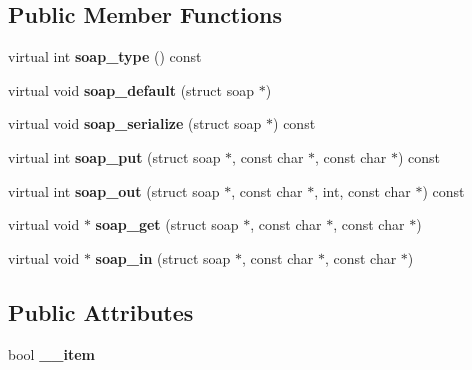 \subsection*{Public Member Functions}
\begin{DoxyCompactItemize}
\item 
\hypertarget{classxsd____boolean_abaa5493fa0ed974d9957b5375282f903}{
virtual int {\bfseries soap\_\-type} () const }
\label{classxsd____boolean_abaa5493fa0ed974d9957b5375282f903}

\item 
\hypertarget{classxsd____boolean_a8f8b468a05c6dbb8f914ab4df0ede130}{
virtual void {\bfseries soap\_\-default} (struct soap $\ast$)}
\label{classxsd____boolean_a8f8b468a05c6dbb8f914ab4df0ede130}

\item 
\hypertarget{classxsd____boolean_a19278a6bc6beb928493f9ec479bf70f7}{
virtual void {\bfseries soap\_\-serialize} (struct soap $\ast$) const }
\label{classxsd____boolean_a19278a6bc6beb928493f9ec479bf70f7}

\item 
\hypertarget{classxsd____boolean_ad3107dbcd150cace93be8add4eb9410d}{
virtual int {\bfseries soap\_\-put} (struct soap $\ast$, const char $\ast$, const char $\ast$) const }
\label{classxsd____boolean_ad3107dbcd150cace93be8add4eb9410d}

\item 
\hypertarget{classxsd____boolean_a6e22f1d1ef885c789d45e92e9e72dc3d}{
virtual int {\bfseries soap\_\-out} (struct soap $\ast$, const char $\ast$, int, const char $\ast$) const }
\label{classxsd____boolean_a6e22f1d1ef885c789d45e92e9e72dc3d}

\item 
\hypertarget{classxsd____boolean_a97d12c069bef37577a4983f2a8cb9ee8}{
virtual void $\ast$ {\bfseries soap\_\-get} (struct soap $\ast$, const char $\ast$, const char $\ast$)}
\label{classxsd____boolean_a97d12c069bef37577a4983f2a8cb9ee8}

\item 
\hypertarget{classxsd____boolean_a9d816c863ef1d7c66f18159596b54863}{
virtual void $\ast$ {\bfseries soap\_\-in} (struct soap $\ast$, const char $\ast$, const char $\ast$)}
\label{classxsd____boolean_a9d816c863ef1d7c66f18159596b54863}

\end{DoxyCompactItemize}
\subsection*{Public Attributes}
\begin{DoxyCompactItemize}
\item 
\hypertarget{classxsd____boolean_a8c655e291e7c57582dc578a18565a7b1}{
bool {\bfseries \_\-\_\-item}}
\label{classxsd____boolean_a8c655e291e7c57582dc578a18565a7b1}

\end{DoxyCompactItemize}



